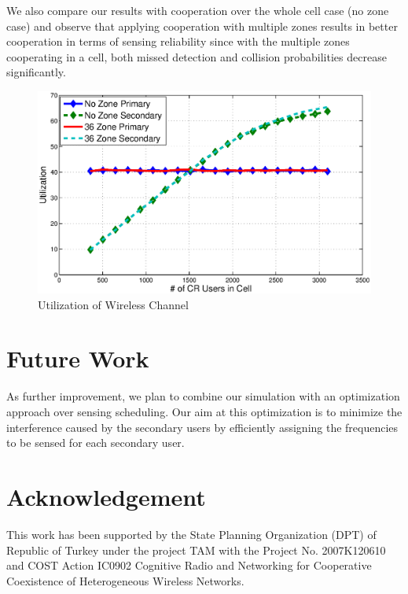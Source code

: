 \documentclass[conference,compsoc]{IEEEtran}
\begin{document}
We also compare our results with cooperation over the whole cell case (no zone case) and observe that applying cooperation with multiple zones results in better cooperation in terms of sensing reliability since with the multiple zones cooperating in a cell, both missed detection and collision probabilities decrease significantly.

\begin{figure}[t]
\centering
\includegraphics[width=0.99\columnwidth,keepaspectratio] {figs/util.eps}
\caption{Utilization of Wireless Channel} \label{fig:util}
\end{figure}

\section{\label{sec:future}Future Work}
As further improvement, we plan to combine our simulation with an optimization approach over sensing scheduling. Our aim at this optimization is to minimize the interference caused by the secondary users by efficiently assigning the frequencies to be sensed for each secondary user.

\section*{Acknowledgement}
This work has been supported by the State Planning Organization (DPT) of Republic of Turkey under the project TAM with the Project No. 2007K120610 and COST Action IC0902 Cognitive Radio and Networking for Cooperative Coexistence of Heterogeneous Wireless Networks.




\end{document}
